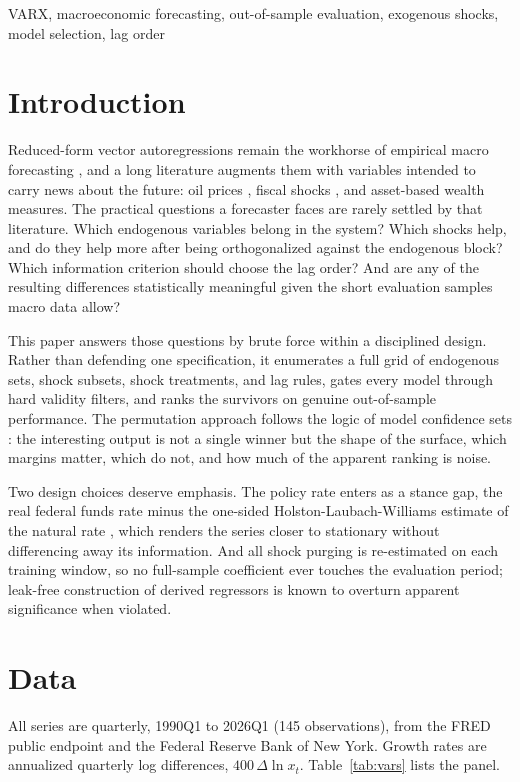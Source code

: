 \documentclass[conference]{IEEEtran}
\begin{document}
\begin{IEEEkeywords}
VARX, macroeconomic forecasting, out-of-sample evaluation, exogenous shocks, model selection, lag order
\end{IEEEkeywords}

\section{Introduction}
Reduced-form vector autoregressions remain the workhorse of empirical macro forecasting \cite{sims1980}, and a long literature augments them with variables intended to carry news about the future: oil prices \cite{kilian2008}, fiscal shocks \cite{ramey2011}, and asset-based wealth measures. The practical questions a forecaster faces are rarely settled by that literature. Which endogenous variables belong in the system? Which shocks help, and do they help more after being orthogonalized against the endogenous block? Which information criterion should choose the lag order? And are any of the resulting differences statistically meaningful given the short evaluation samples macro data allow?

This paper answers those questions by brute force within a disciplined design. Rather than defending one specification, it enumerates a full grid of endogenous sets, shock subsets, shock treatments, and lag rules, gates every model through hard validity filters, and ranks the survivors on genuine out-of-sample performance. The permutation approach follows the logic of model confidence sets \cite{hansen2011}: the interesting output is not a single winner but the shape of the surface, which margins matter, which do not, and how much of the apparent ranking is noise.

Two design choices deserve emphasis. The policy rate enters as a stance gap, the real federal funds rate minus the one-sided Holston-Laubach-Williams estimate of the natural rate \cite{hlw2023}, which renders the series closer to stationary without differencing away its information. And all shock purging is re-estimated on each training window, so no full-sample coefficient ever touches the evaluation period; leak-free construction of derived regressors is known to overturn apparent significance when violated.

\section{Data}
All series are quarterly, 1990Q1 to 2026Q1 (145 observations), from the FRED public endpoint and the Federal Reserve Bank of New York. Growth rates are annualized quarterly log differences, $400\,\Delta \ln x_t$. Table~\ref{tab:vars} lists the panel.
\end{document}
